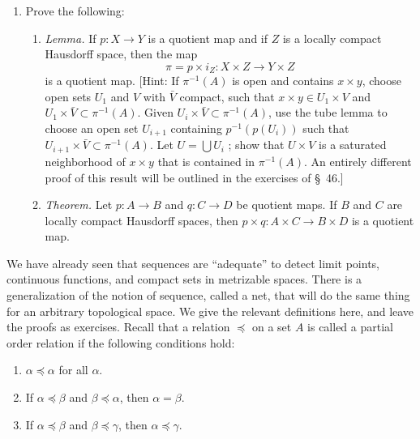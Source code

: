 \begin{enumerate}[itemsep=0.4em, parsep=0pt, topsep=0pt, partopsep=0pt, leftmargin=*, label=\arabic*., ref=\arabic*]
\item[*11.] Prove the following:
 \begin{enumerate}[itemsep=0.2em, parsep=0pt, topsep=0pt, partopsep=0pt, leftmargin=*, label=(\alph*), align=left]
 \item \textsl{Lemma.} If \(p : X \rightarrow Y\) is a quotient map and if \(Z\) is a locally compact Hausdorff space, then the map \[ \pi = p \times {i}_{Z} : X \times Z \rightarrow Y \times Z \] is a quotient map. [Hint: If \({\pi }^{-1}( A)\) is open and contains \(x \times y\), choose open sets \(U_{1}\) and \(V\) with \(\bar{V}\) compact, such that \(x \times y \in {U}_{1} \times V\) and \(U_{1} \times \bar{V} \subset {\pi }^{-1}( A)\). Given \(U_{i} \times \bar{V} \subset {\pi }^{-1}( A)\), use the tube lemma to choose an open set \(U_{i + 1}\) containing \(p^{-1}( {p( U_{i}) })\) such that \(U_{i + 1} \times \bar{V} \subset {\pi }^{-1}( A)\). Let \(U = \bigcup {U}_{i}\) ; show that \(U \times V\) is a saturated neighborhood of \(x \times y\) that is contained in \({\pi }^{-1}( A)\). An entirely different proof of this result will be outlined in the exercises of \S\ 46.]
 \item \textsl{Theorem.} Let \(p : A \rightarrow B\) and \(q : C \rightarrow D\) be quotient maps. If \(B\) and \(C\) are locally compact Hausdorff spaces, then \(p \times q : A \times C \rightarrow B \times D\) is a quotient map.
 \end{enumerate}
\end{enumerate}

We have already seen that sequences are ``adequate'' to detect limit points, continuous functions, and compact sets in metrizable spaces. There is a generalization of the notion of sequence, called a net, that will do the same thing for an arbitrary topological space. We give the relevant definitions here, and leave the proofs as exercises. Recall that a relation \(\preccurlyeq\) on a set \(A\) is called a partial order relation if the following conditions hold:

\begin{enumerate}[itemsep=0.2em, parsep=0pt, topsep=0pt, partopsep=0pt, leftmargin=*, label=(\arabic*), align=left]
\item \(\alpha \preccurlyeq \alpha\) for all \(\alpha\).
\item If \(\alpha \preccurlyeq \beta\) and \(\beta \preccurlyeq \alpha\), then \(\alpha = \beta\).
\item If \(\alpha \preccurlyeq \beta\) and \(\beta \preccurlyeq \gamma\), then \(\alpha \preccurlyeq \gamma\).
\end{enumerate}

